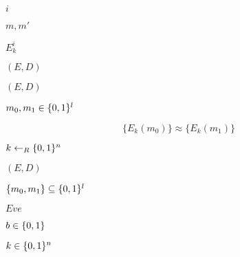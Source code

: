 \documentclass[10pt]{book}
\begin{document}
\begin{mdSnippets}
\begin{mdInlineSnippet}[865c0c0b4ab0e063e5caa3387c1a8741]%
$i$\end{mdInlineSnippet}%
\begin{mdInlineSnippet}[67db24c9d6367e147ee325c66a0a5bac]%
$m,m'$\end{mdInlineSnippet}%
\begin{mdInlineSnippet}[8b204ff531f8a7d3f7d599ca2adc3430]%
$E^i_k$\end{mdInlineSnippet}%
\begin{mdInlineSnippet}[c150726dc018e82825c0c3617f46a1c9]%
$(E,D)$\end{mdInlineSnippet}%
\begin{mdInlineSnippet}[c150726dc018e82825c0c3617f46a1c9]%
$(E,D)$\end{mdInlineSnippet}%
\begin{mdInlineSnippet}[79813aa61163871708c094e8192a07e2]%
$m_0,m_1 \in \{0,1\}^l$\end{mdInlineSnippet}%
\begin{mdDisplaySnippet}[6390167cb241c835f315db97360a658e]%
\[%
\{E_k(m_0)\} \approx \{E_k(m_1)\}
\]%
\end{mdDisplaySnippet}%
\begin{mdInlineSnippet}[6933709c18472bddc33d71a676128586]%
$k \gets_R \{0,1\}^n$\end{mdInlineSnippet}%
\begin{mdInlineSnippet}[c150726dc018e82825c0c3617f46a1c9]%
$(E,D)$\end{mdInlineSnippet}%
\begin{mdInlineSnippet}[ca5745101ffc39bc290c6ec38b23c73e]%
$\{m_0, m_1\} \subseteq \{0,1\}^l$\end{mdInlineSnippet}%
\begin{mdInlineSnippet}%
$Eve$\end{mdInlineSnippet}%
\begin{mdInlineSnippet}[6892f7e7c3b8ecc19e4a077e82515567]%
$b \in \{0,1\}$\end{mdInlineSnippet}%
\begin{mdInlineSnippet}%
$k \in \{0,1\}^n$\end{mdInlineSnippet}%

\end{mdSnippets}
\end{document}
